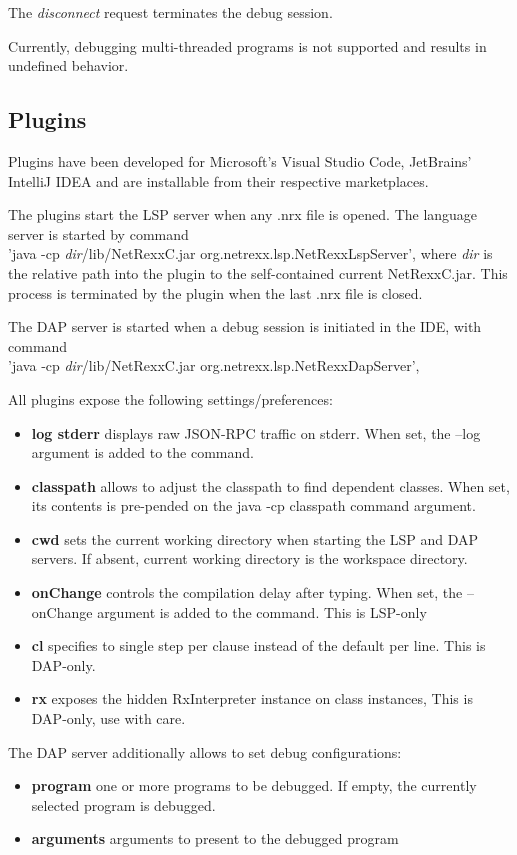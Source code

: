 The \emph{disconnect} request terminates the debug session.

Currently, debugging multi-threaded programs is not supported and results in undefined behavior.

\subsection{Plugins}

Plugins have been developed for Microsoft's Visual Studio Code, JetBrains' IntelliJ IDEA and are installable from their
respective marketplaces.

The plugins start the LSP server when any .nrx file is opened.
The language server is started by command \\
'java -cp \emph{dir}/lib/NetRexxC.jar org.netrexx.lsp.NetRexxLspServer',
where \emph{dir} is the relative path into the plugin to the self-contained current NetRexxC.jar.
This process is terminated by the plugin when the last .nrx file is closed.

The DAP server is started when a debug session is initiated in the IDE, with command \\
’java ‑cp \emph{dir}/lib/NetRexxC.jar org.netrexx.lsp.NetRexxDapServer’,

All plugins expose the following settings/preferences:
\begin{itemize}
 \item \textbf{log stderr} displays raw JSON-RPC traffic on stderr. When set, the --log argument
 is added to the command.
 \item \textbf{classpath} allows to adjust the classpath to find dependent classes. When set,
 its contents is pre-pended on the java -cp classpath command argument.
 \item \textbf{cwd} sets the current working directory when starting the LSP and DAP servers. If absent,
 current working directory is the workspace directory.
 \item \textbf{onChange} controls the compilation delay after typing. When set, the --onChange
 argument is added to the command. This is LSP-only
 \item \textbf{cl} specifies to single step per clause instead of the default per line. This is DAP-only.
 \item \textbf{rx} exposes the hidden RxInterpreter instance on class instances, This is DAP-only, use with care.
\end{itemize}

The DAP server additionally allows to set debug configurations:
\begin{itemize}
 \item \textbf{program} one or more programs to be debugged. If empty, the currently selected \nr{} program is
 debugged.
 \item \textbf{arguments} arguments to present to the debugged program
\end{itemize}



